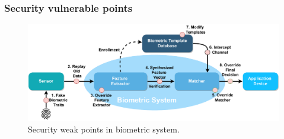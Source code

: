 \subsubsection{Security vulnerable points}
\label{Security vulnerable points}

\begin{figure}[h]
	\centering
	\includegraphics[width=\linewidth]{obrazky-figures/BiometricSystemWeakPoints.pdf}
	\caption{Security weak points in biometric system.}
	\label{BiometricSystemSecurityWeakPoints}
\end{figure}

